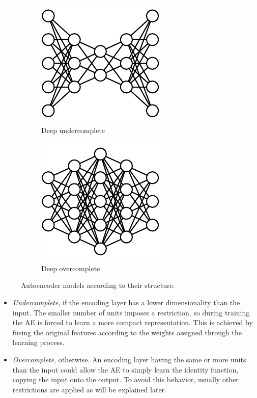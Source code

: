 \documentclass[preprint,5p,compress]{elsarticle}
\begin{document}
\begin{figure}[h!]
	\begin{subfigure}[t]{0.45\textwidth}
		\centering
		\includegraphics[width=0.7\linewidth]{DeepUndercomplete.pdf} 
		\caption{Deep undercomplete} \label{Fig.DeepUnder}
	\end{subfigure}
	\hfill
	\begin{subfigure}[t]{0.45\textwidth}
		\centering
		\includegraphics[width=0.7\linewidth]{DeepOvercomplete.pdf} 
		\caption{Deep overcomplete} \label{Fig.DeepOver}
	\end{subfigure}
	\caption{Autoencoder models according to their structure.}
	\label{Fig.Structure}
\end{figure}


\begin{itemize}
	\item \textit{Undercomplete}, if the encoding layer has a lower dimensionality than the input. The smaller number of units imposes a restriction, so during training the AE is forced to learn a more compact representation. This is achieved by fusing the original features according to the weights assigned through the learning process.
	
	\item \textit{Overcomplete}, otherwise. An encoding layer having the same or more units than the input could allow the AE to simply learn the identity function, copying the input onto the output. To avoid this behavior, usually other restrictions are applied as will be explained later.
\end{itemize}
\end{document}
